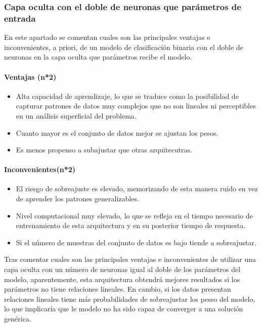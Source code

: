 \subsubsection{Capa oculta con el doble de neuronas que parámetros de entrada}\label{sec:VIBIN98}
En este apartado se comentan cuales son las principales ventajas e inconvenientes, a priori, de un modelo de clasificación binaria con el doble de neuronas en la capa oculta que parámetros recibe el modelo.

\paragraph{Ventajas (n*2)}
\begin{itemize}
	\item Alta capacidad de aprendizaje, lo que se traduce como la posibilidad de capturar patrones de datos muy complejos que no son lineales ni perceptibles en un análisis superficial del problema.
	\item Cuanto mayor es el conjunto de datos mejor se ajustan los pesos.
	\item Es menos propenso a subajustar que otras arquitecutras.
\end{itemize}
\paragraph{Inconvenientes(n*2)}
\begin{itemize}
	\item El riesgo de sobreajuste es elevado, memorizando de esta manera ruido en vez de aprender los patrones generalizables.
	\item Nivel computacional muy elevado, lo que se refleja en el tiempo necesario de entrenamiento de esta arquitectura y en su posterior tiempo de respuesta.
	\item Si el número de muestras del conjunto de datos es bajo tiende a sobreajustar.
\end{itemize}

Tras comentar cuales son las principales ventajas e inconvenientes de utilizar una capa oculta con un número de neuronas igual al doble de los parámetros del modelo, aparentemente, esta arquitectura obtendrá mejores resultados si los parámetros no tiene relaciones lineales. En cambio, si los datos presentan relaciones lineales tiene más probabilidades de sobreajustar los pesso del modelo, lo que implicaría que le modelo no ha sido capaz de converger a una solución genérica.

